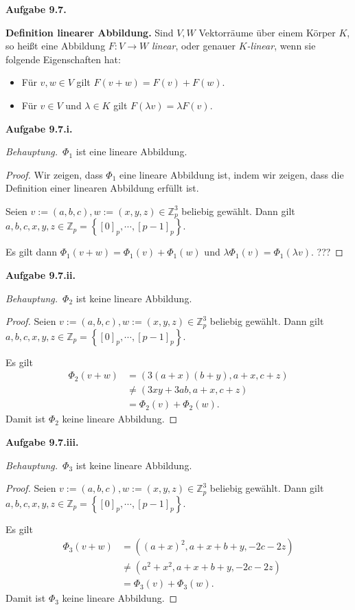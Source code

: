 \documentclass[12pt]{extarticle}
\newcommand{\mg}[1]{\mathbb{#1}}
\newcommand{\aufgn}[1]{\textbf{Aufgabe #1.}}
\newcommand{\beh}{\textit{Behauptung.}\ }
\begin{document}
\aufgn{9.7}

\textbf{Definition linearer Abbildung.}  Sind \(V, W\)
Vektorräume über einem Körper \(K\), so heißt eine
Abbildung \(F \colon V \to W\) \textit{linear}, oder
genauer \textit{\(K\)-linear}, wenn sie folgende
Eigenschaften hat:

\begin{itemize}
\item Für \(v, w \in V\) gilt \(F(v + w) = F(v) + F(w)\).
\item Für \(v \in V\) und \(\lambda \in K\) gilt $F(\lambda
  v) = \lambda F(v)$.
\end{itemize}

\aufgn{9.7.i}

\beh \(\Phi_1\) ist eine lineare Abbildung.

\begin{proof}
Wir zeigen, dass \(\Phi_1\) eine lineare Abbildung ist,
indem wir zeigen, dass die Definition einer linearen
Abbildung erfüllt ist.

  Seien \(v:=(a, b, c), w:=(x, y, z) \in \mg{Z}^3_p\) beliebig
  gewählt.  Dann gilt $a, b, c, x, y, z \in \mg{Z}_p =
  \left\{ [0]_p, \cdots, [p-1]_p \right\}$.

  Es gilt dann \(\Phi_1(v+w)=\Phi_1(v)+\Phi_1(w)\) und
  \(\lambda \Phi_1(v) = \Phi_1(\lambda v)\).   ???
\end{proof}

\aufgn{9.7.ii}

\beh \(\Phi_2\) ist keine lineare Abbildung.

\begin{proof}
  Seien \(v:=(a, b, c), w:=(x, y, z) \in \mg{Z}^3_p\) beliebig
  gewählt.  Dann gilt $a, b, c, x, y, z \in \mg{Z}_p =
  \left\{ [0]_p, \cdots, [p-1]_p \right\}$.

  Es gilt
\begin{align*}
  \Phi_2(v+w) &= (3(a+x)(b+y), a+x, c + z) \\
              &\ne (3xy+3ab, a+x, c + z)\\
              &= \Phi_2(v) + \Phi_2(w).
\end{align*}  Damit ist \(\Phi_2\) keine lineare Abbildung.
\end{proof}
\aufgn{9.7.iii}

\beh \(\Phi_{3}\) ist keine lineare Abbildung.

\begin{proof}
  Seien \(v:=(a, b, c), w:=(x, y, z) \in \mg{Z}^3_p\) beliebig
  gewählt.  Dann gilt $a, b, c, x, y, z \in \mg{Z}_p =
  \left\{ [0]_p, \cdots, [p-1]_p \right\}$.

  Es gilt
\begin{align*}
  \Phi_3(v+w) &= ((a+x)^2, a+x+b+y, -2c-2z)\\
              &\ne (a^2+x^2, a+x+b+y, -2c-2z)\\
              &= \Phi_3(v) + \Phi_3(w).
\end{align*}  Damit ist \(\Phi_3\) keine lineare Abbildung.
\end{proof}
\end{document}
